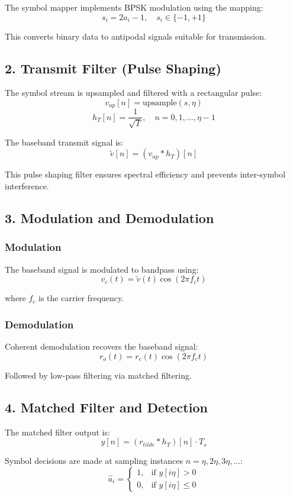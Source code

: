 \documentclass[12pt]{article}
\begin{document}
The symbol mapper implements BPSK modulation using the mapping:
$$s_i = 2a_i - 1, \quad s_i \in \{-1, +1\}$$

This converts binary data to antipodal signals suitable for transmission.

\subsection{2. Transmit Filter (Pulse Shaping)}

The symbol stream is upsampled and filtered with a rectangular pulse:
$$v_{up}[n] = \text{upsample}(s, \eta)$$
$$h_T[n] = \frac{1}{\sqrt{T}}, \quad n = 0, 1, \ldots, \eta-1$$

The baseband transmit signal is:
$$\tilde{v}[n] = (v_{up} * h_T)[n]$$

This pulse shaping filter ensures spectral efficiency and prevents inter-symbol interference.

\subsection{3. Modulation and Demodulation}

\subsubsection{Modulation}
The baseband signal is modulated to bandpass using:
$$v_c(t) = \tilde{v}(t) \cos(2\pi f_c t)$$

where $f_c$ is the carrier frequency.

\subsubsection{Demodulation}
Coherent demodulation recovers the baseband signal:
$$r_o(t) = r_c(t) \cos(2\pi f_c t)$$

Followed by low-pass filtering via matched filtering.

\subsection{4. Matched Filter and Detection}

The matched filter output is:
$$y[n] = (r_{tilde} * h_T)[n] \cdot T_s$$

Symbol decisions are made at sampling instances $n = \eta, 2\eta, 3\eta, \ldots$:
$$\hat{a}_i = \begin{cases} 1, & \text{if } y[i\eta] > 0 \\ 0, & \text{if } y[i\eta] \leq 0 \end{cases}$$
\end{document}
